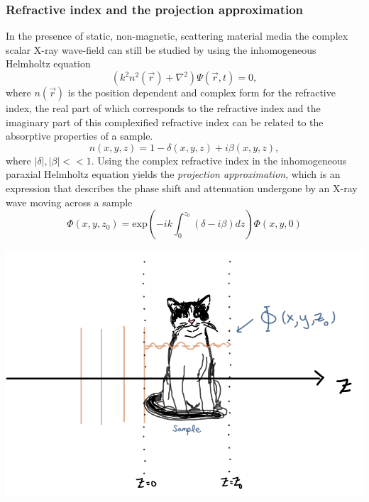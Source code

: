 \documentclass[9pt, a4paper]{article}
\newenvironment{Figure}
    {\par\medskip\noindent\minipage{\linewidth}}
    {\endminipage\par\medskip}
\begin{document}
\subsubsection{Refractive index and the projection approximation}
In the presence of static, non-magnetic, scattering material media the complex scalar X-ray wave-field can still be studied by using the inhomogeneous Helmholtz equation 
\begin{equation}\label{eq:10}
\left ( k^2 n^2 (\vec{r}) + \nabla^{2}  \right )\Psi(\vec{r},t) = 0,
\end{equation}
where $n(\vec{r})$ is the position dependent and complex form for the refractive index, the real part of which corresponds to the refractive index and the imaginary part of this complexified refractive index can be related to the absorptive properties of a sample\cite{PagsTutes}.
\begin{equation}\label{eq:11}
n(x, y, z) = 1 - \delta(x, y, z) + i \beta(x, y, z),
\end{equation}
where $|\delta|, |\beta| << 1$. Using the complex refractive index in the inhomogeneous paraxial Helmholtz equation yields the \textit{projection approximation}, which is an expression that describes the phase shift and attenuation undergone by an X-ray wave moving across a sample
\begin{equation}\label{eq:12}
\Phi(x, y, z_0) = \mathrm{exp} \left ( -ik \int_{0}^{z_0}(\delta - i\beta)dz\right ) \Phi(x, y, 0)
\end{equation}
\begin{Figure}
\centering
\includegraphics[width=0.6\linewidth]{projection_approximation.png}
\end{Figure}
\end{document}
